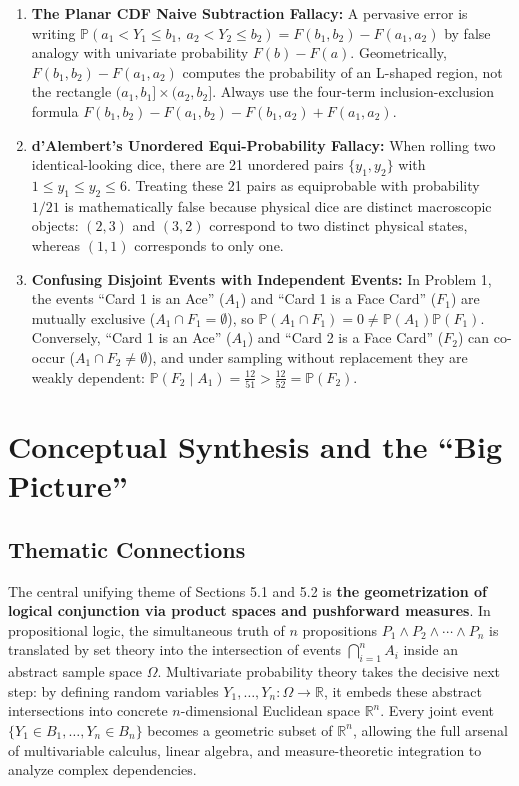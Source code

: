 \documentclass[11pt, letterpaper]{article}
\theoremstyle{definition}
\theoremstyle{remark}
\newcommand{\R}{\mathbb{R}}
\newcommand{\Prob}{\mathbb{P}}
\begin{document}
\begin{enumerate}[label=\textbf{\arabic*.}]
    \item \textbf{The Planar CDF Naive Subtraction Fallacy:} A pervasive error is writing $\Prob(a_1 < Y_1 \le b_1,\ a_2 < Y_2 \le b_2) = F(b_1, b_2) - F(a_1, a_2)$ by false analogy with univariate probability $F(b) - F(a)$. Geometrically, $F(b_1, b_2) - F(a_1, a_2)$ computes the probability of an L-shaped region, not the rectangle $(a_1, b_1] \times (a_2, b_2]$. Always use the four-term inclusion-exclusion formula $F(b_1, b_2) - F(a_1, b_2) - F(b_1, a_2) + F(a_1, a_2)$.
    \item \textbf{d'Alembert's Unordered Equi-Probability Fallacy:} When rolling two identical-looking dice, there are 21 unordered pairs $\{y_1, y_2\}$ with $1 \le y_1 \le y_2 \le 6$. Treating these 21 pairs as equiprobable with probability $1/21$ is mathematically false because physical dice are distinct macroscopic objects: $(2, 3)$ and $(3, 2)$ correspond to two distinct physical states, whereas $(1, 1)$ corresponds to only one.
    \item \textbf{Confusing Disjoint Events with Independent Events:} In Problem 1, the events ``Card 1 is an Ace'' ($A_1$) and ``Card 1 is a Face Card'' ($F_1$) are mutually exclusive ($A_1 \cap F_1 = \emptyset$), so $\Prob(A_1 \cap F_1) = 0 \neq \Prob(A_1)\Prob(F_1)$. Conversely, ``Card 1 is an Ace'' ($A_1$) and ``Card 2 is a Face Card'' ($F_2$) can co-occur ($A_1 \cap F_2 \neq \emptyset$), and under sampling without replacement they are weakly dependent: $\Prob(F_2 \mid A_1) = \frac{12}{51} > \frac{12}{52} = \Prob(F_2)$.
\end{enumerate}

\newpage
\section{Conceptual Synthesis and the ``Big Picture''}

\subsection{Thematic Connections}

The central unifying theme of Sections 5.1 and 5.2 is \textbf{the geometrization of logical conjunction via product spaces and pushforward measures}. In propositional logic, the simultaneous truth of $n$ propositions $P_1 \wedge P_2 \wedge \cdots \wedge P_n$ is translated by set theory into the intersection of events $\bigcap_{i=1}^n A_i$ inside an abstract sample space $\Omega$. Multivariate probability theory takes the decisive next step: by defining random variables $Y_1, \dots, Y_n : \Omega \to \R$, it embeds these abstract intersections into concrete $n$-dimensional Euclidean space $\R^n$. Every joint event $\{Y_1 \in B_1, \dots, Y_n \in B_n\}$ becomes a geometric subset of $\R^n$, allowing the full arsenal of multivariable calculus, linear algebra, and measure-theoretic integration to analyze complex dependencies.
\end{document}
